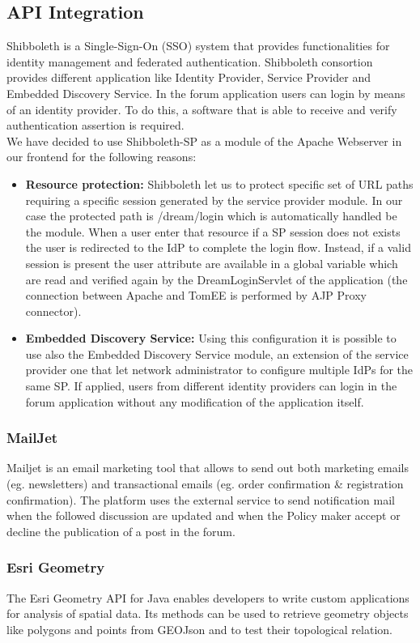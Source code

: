 \subsection{API Integration} 
Shibboleth is a Single-Sign-On (SSO) system that provides functionalities for identity management and federated authentication. Shibboleth consortion provides different application like Identity Provider, Service Provider and Embedded Discovery Service. 
In the forum application users can login by means of an identity provider. To do this, a software that is able to receive and verify authentication assertion is required.\\
We have decided to use Shibboleth-SP as a module of the Apache Webserver in our frontend for the following reasons:
\begin{itemize}
    \item \textbf{Resource protection:} Shibboleth let us to protect specific set of URL paths requiring a specific session generated by the service provider module. In our case the protected path is /dream/login which is automatically handled be the module. When a user enter that resource if a SP session does not exists the user is redirected to the IdP to complete the login flow. Instead, if a valid session is present the user attribute are available in a global variable which are read and verified again by the DreamLoginServlet of the application (the connection between Apache and TomEE is performed by AJP Proxy connector).
    \item \textbf{Embedded Discovery Service:} Using this configuration it is possible to use also the Embedded Discovery Service module, an extension of the service provider one that let network administrator to configure multiple IdPs for the same SP. If applied, users from different identity providers can login in the forum application without any modification of the application itself.
\end{itemize}

\subsubsection{MailJet}
Mailjet is an email marketing tool that allows to send out both marketing emails (eg. newsletters) and transactional emails (eg. order confirmation \& registration confirmation). The platform uses the external service to send notification mail when the followed discussion are updated and when the Policy maker accept or decline the publication of a post in the forum.

\subsubsection{Esri Geometry}

The Esri Geometry API for Java enables developers to write custom applications for analysis of spatial data. Its methods can be used to retrieve geometry objects like polygons and points from GEOJson and to test their topological relation.